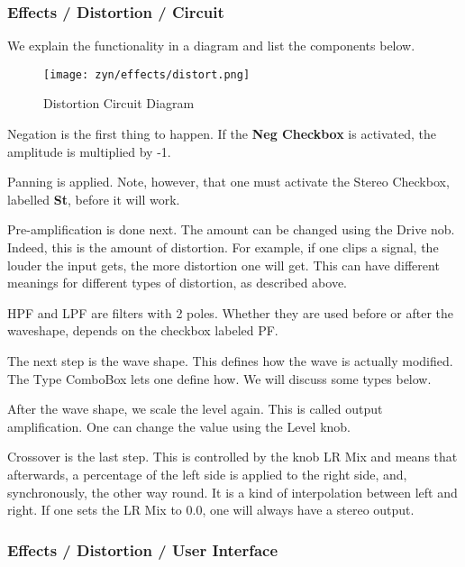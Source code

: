 \subsubsection{Effects / Distortion / Circuit}
\label{subsubsec:effects_edit_distortion_circuit}

   We explain the functionality in a diagram and list the components below.

\begin{figure}[H]
   \centering
   \texttt{[image: zyn/effects/distort.png]}
   \caption{Distortion Circuit Diagram}
   \label{fig:distortion_circuit_diagram}
\end{figure}

   Negation is the first thing to happen. If the \textbf{Neg Checkbox} is
   activated, the amplitude is multiplied by -1.

   Panning is applied. Note, however, that one must activate the Stereo
   Checkbox, labelled \textbf{St}, before it will work.

   Pre-amplification is done next. The amount can be changed using the Drive
   nob. Indeed, this is the amount of distortion. For example, if one clips a
   signal, the louder the input gets, the more distortion one will get. This
   can have different meanings for different types of distortion, as
   described above.

   HPF and LPF are filters with 2 poles. Whether they are used before or
   after the waveshape, depends on the checkbox labeled PF.

   The next step is the wave shape. This defines how the wave is actually
   modified. The Type ComboBox lets one define how. We will discuss some
   types below.

   After the wave shape, we scale the level again. This is called output
   amplification. One can change the value using the Level knob.

   Crossover is the last step. This is controlled by the knob LR Mix and
   means that afterwards, a percentage of the left side is applied to the
   right side, and, synchronously, the other way round. It is a kind of
   interpolation between left and right. If one sets the LR Mix to 0.0, one
   will always have a stereo output.

\subsubsection{Effects / Distortion / User Interface}
\label{subsubsec:effects_edit_distortion_ui}

